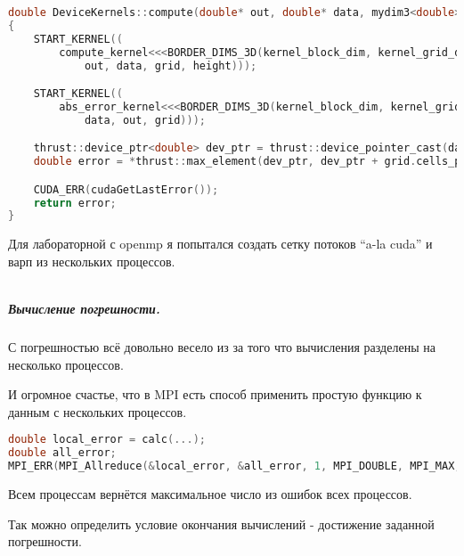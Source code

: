 \documentclass[12pt]{article}
\begin{document}
\begin{lstlisting}[language=c++,basicstyle=\scriptsize]
double DeviceKernels::compute(double* out, double* data, mydim3<double> height)
{
    START_KERNEL((
        compute_kernel<<<BORDER_DIMS_3D(kernel_block_dim, kernel_grid_dim)>>>(
            out, data, grid, height)));

    START_KERNEL((
        abs_error_kernel<<<BORDER_DIMS_3D(kernel_block_dim, kernel_grid_dim)>>>(
            data, out, grid)));

    thrust::device_ptr<double> dev_ptr = thrust::device_pointer_cast(data);
    double error = *thrust::max_element(dev_ptr, dev_ptr + grid.cells_per_block());

    CUDA_ERR(cudaGetLastError());
    return error;
}
\end{lstlisting}

Для лабораторной с openmp я попытался создать сетку потоков ``a-la cuda'' и варп из нескольких процессов.

\begin{lstlisting}

\end{lstlisting}

\subparagraph*{Вычисление погрешности.}

С погрешностью всё довольно весело из за того что вычисления разделены на несколько процессов.

И огромное счастье, что в MPI есть способ применить простую функцию к данным с нескольких процессов.

\begin{lstlisting}[language=c++]
double local_error = calc(...);
double all_error;
MPI_ERR(MPI_Allreduce(&local_error, &all_error, 1, MPI_DOUBLE, MPI_MAX, MPI_COMM_WORLD));
\end{lstlisting}

Всем процессам вернётся максимальное число из ошибок всех процессов.

Так можно определить условие окончания вычислений - достижение заданной погрешности.


\end{document}
